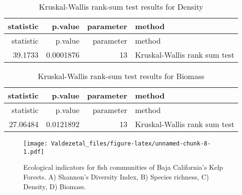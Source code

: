 \documentclass[12pt,]{article}
\begin{document}
\begin{longtable}[]{@{}rrrl@{}}
\caption{Kruskal-Wallis rank-sum test results for
Density}\tabularnewline
\toprule
statistic & p.value & parameter & method\tabularnewline
\midrule
\endfirsthead
\toprule
statistic & p.value & parameter & method\tabularnewline
\midrule
\endhead
39.1733 & 0.0001876 & 13 & Kruskal-Wallis rank sum test\tabularnewline
\bottomrule
\end{longtable}

\begin{longtable}[]{@{}rrrl@{}}
\caption{Kruskal-Wallis rank-sum test results for
Biomass}\tabularnewline
\toprule
statistic & p.value & parameter & method\tabularnewline
\midrule
\endfirsthead
\toprule
statistic & p.value & parameter & method\tabularnewline
\midrule
\endhead
27.06484 & 0.0121892 & 13 & Kruskal-Wallis rank sum test\tabularnewline
\bottomrule
\end{longtable}

\begin{figure}
\centering
\texttt{[image: Valdezetal\_files/figure-latex/unnamed-chunk-8-1.pdf]}
\caption{Ecological indicators for fish communities of Baja California's
Kelp Forests. A) Shannon's Diversity Index, B) Species richness, C)
Density, D) Biomass.}
\end{figure}
\end{document}
